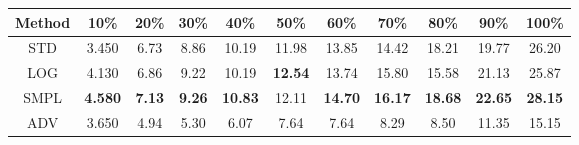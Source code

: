 \documentclass{standalone}
\begin{document}
\begin{tabular}{c|cccccccccc}
      \toprule
      Method & 10\% & 20\% & 30\% & 40\% & 50\% & 60\% & 70\% & 80\% & 90\% & 100\% \\
      \midrule
STD & 3.450 & 6.73 & 8.86 & 10.19 & 11.98 & 13.85 & 14.42 & 18.21 & 19.77 & 26.20\\
LOG & 4.130 & 6.86 & 9.22 & 10.19 & \textbf{12.54} & 13.74 & 15.80 & 15.58 & 21.13 & 25.87\\
SMPL & \textbf{4.580} & \textbf{7.13} & \textbf{9.26} & \textbf{10.83} & 12.11 & \textbf{14.70} & \textbf{16.17} & \textbf{18.68} & \textbf{22.65} & \textbf{28.15}\\
ADV & 3.650 & 4.94 & 5.30 & 6.07 & 7.64 & 7.64 & 8.29 & 8.50 & 11.35 & 15.15\\
  \bottomrule
\end{tabular}
\end{document}

